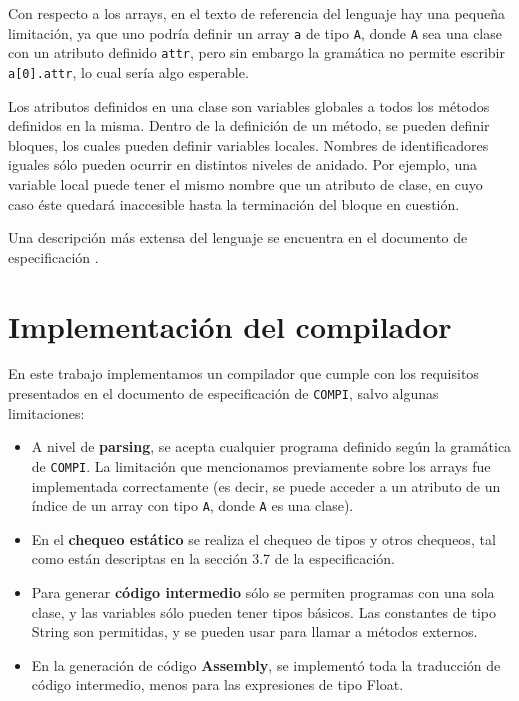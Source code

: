 \documentclass[a4paper,10pt]{article}
\begin{document}
Con respecto a los arrays, en el texto de referencia del lenguaje hay una pequeña limitación, ya que uno podría definir
un array \verb|a| de tipo \verb|A|, donde \verb|A| sea una clase con un atributo definido \verb|attr|, 
pero sin embargo la gramática no permite escribir \verb|a[0].attr|, lo cual sería algo esperable.


Los atributos definidos en una clase son variables globales a todos los métodos definidos en la misma. Dentro de la
definición de un método, se pueden definir bloques, los cuales pueden definir variables locales. Nombres de identificadores
iguales sólo pueden ocurrir en distintos niveles de anidado. Por ejemplo, una variable local puede tener el mismo nombre 
que un atributo de clase, en cuyo caso éste quedará inaccesible hasta la terminación del bloque en cuestión.

Una descripción más extensa del lenguaje se encuentra en el documento de especificación \cite{COMPISpec}.


\section{Implementación del compilador}

En este trabajo implementamos un compilador que cumple con los requisitos presentados en el documento de especificación de \verb|COMPI|, 
salvo algunas limitaciones:

\begin{itemize}
 \item A nivel de \textbf{parsing}, se acepta cualquier programa definido según la gramática de \verb|COMPI|. La limitación que mencionamos previamente
       sobre los arrays fue implementada correctamente (es decir, se puede acceder a un atributo de un índice de un array con tipo
       \verb|A|, donde \verb|A| es una clase).
  
  \item En el \textbf{chequeo estático} se realiza el chequeo de tipos y otros chequeos, tal como están descriptas en la sección 3.7 de la especificación.
  
  \item Para generar \textbf{código intermedio} sólo se permiten programas con una sola clase, y las variables sólo pueden tener tipos básicos. Las constantes
        de tipo String son permitidas, y se pueden usar para llamar a métodos externos.
        
  \item En la generación de código \textbf{Assembly}, se implementó toda la traducción de código intermedio, menos para las expresiones de tipo Float.
\end{itemize}
\end{document}
